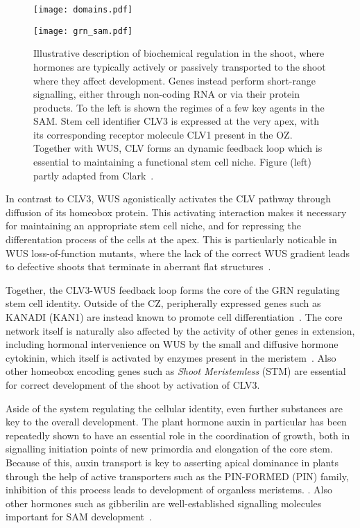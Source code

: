 \begin{figure}[H]
  \centering
  \begin{minipage}{0.55\textwidth}
    \centering
    \texttt{[image: domains.pdf]}
  \end{minipage}\hfill
  \begin{minipage}{0.45\textwidth}
    \centering
    \texttt{[image: grn\_sam.pdf]} 
  \end{minipage}
  \caption[Regulation of apical stem cells]{Illustrative description of
    biochemical regulation in the shoot, where hormones are typically actively or
    passively transported to the shoot where they affect development. Genes
    instead perform short-range signalling, either through non-coding RNA or
    via their protein products. To the left is shown the regimes of a few
    key agents in the SAM. Stem cell identifier CLV3 is expressed at the
    very apex, with its corresponding receptor molecule CLV1 present in the
    OZ. Together with WUS, CLV forms an dynamic feedback loop which is
    essential to maintaining a functional stem cell niche. Figure (left) partly
    adapted from Clark~\cite{clark2001cell}.}
  \label{fig:sam_grn}
\end{figure}

In contrast to CLV3, WUS agonistically  
activates the CLV pathway through diffusion of its homeobox protein. This activating
interaction makes it necessary for maintaining an appropriate stem
cell niche, and for repressing the differentation process of the cells at the
apex. This is particularly noticable in WUS loss-of-function mutants, where the
lack of the correct WUS gradient leads to defective shoots that terminate in
aberrant flat structures~\cite{laux1996wuschel}.

Together, the CLV3-WUS feedback loop forms the core of the GRN regulating stem
cell identity. Outside of the CZ, peripherally expressed genes such as KANADI
(KAN1) are instead known to promote cell
differentiation~\cite{kerstetter2001kanadi}. The core network
itself is naturally  
also affected by the activity of other genes in extension, including hormonal
intervenience on WUS by the small and diffusive hormone cytokinin, which itself
is activated by enzymes present in the meristem~\cite{hutchison2002cytokinin}. Also other homeobox encoding
genes such as \textit{Shoot Meristemless} (STM) are essential for correct
development of the shoot by activation of CLV3.~\cite{scofield2013arabidopsis}

Aside of the system regulating the cellular identity, even further substances
are key to the overall development.  
The plant hormone auxin in particular has been repeatedly shown to have an
essential role in the coordination of growth, both in 
signalling initiation points of new primordia and elongation of the core stem.
Because of this, auxin transport is key to asserting apical dominance in plants
through the help of active transporters such as the PIN-FORMED (PIN) family,
inhibition of this process leads to development of organless meristems.
\cite{kvrevcek2009pin}. Also other hormones such as gibberilin are well-established
signalling molecules important for SAM
development~\cite{debeaujon2000gibberellin}.

